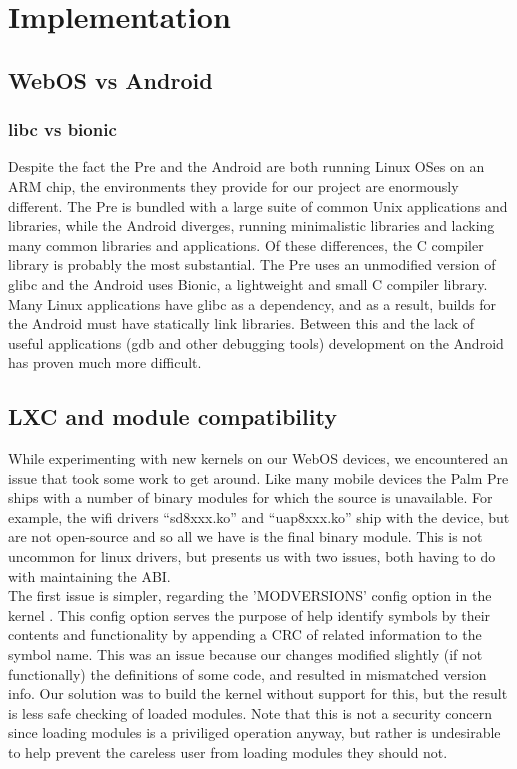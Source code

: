 \section{Implementation}
\label{sec:impl}

\subsection{WebOS vs Android}
\subsubsection{libc vs bionic}
Despite the fact the Pre and the Android are both running Linux OSes on an ARM chip, the environments they provide for our project are enormously different.  The Pre is bundled with a large suite of common Unix applications and libraries, while the Android diverges, running minimalistic libraries and lacking many common libraries and applications.  Of these differences, the C compiler library is probably the most substantial. The Pre uses an unmodified version of glibc and the Android uses Bionic, a lightweight and small C compiler library.  Many Linux applications have glibc as a dependency, and as a result, builds for the Android must have statically link libraries.  Between this and the lack of useful applications (gdb and other debugging tools) development on the Android has proven much more difficult.  \\

\subsection{LXC and module compatibility}

While experimenting with new kernels on our WebOS devices, we encountered an issue that took some work to get around.  Like many mobile devices the Palm Pre ships with a number of binary modules for which the source is unavailable.  For example, the wifi drivers ``sd8xxx.ko'' and ``uap8xxx.ko'' ship with the device, but are not open-source and so all we have is the final binary module.  This is not uncommon for linux drivers, but presents us with two issues, both having to do with maintaining the ABI. \\

    The first issue is simpler, regarding the 'MODVERSIONS' config option in the kernel \cite{modversions}.  This config option serves the purpose of help identify symbols by their contents and functionality by appending a CRC of related information to the symbol name.  This was an issue because our changes modified slightly (if not functionally) the definitions of some code, and resulted in mismatched version info.  Our solution was to build the kernel without support for this, but the result is less safe checking of loaded modules.  Note that this is not a security concern since loading modules is a priviliged operation anyway, but rather is undesirable to help prevent the careless user from loading modules they should not. \\

